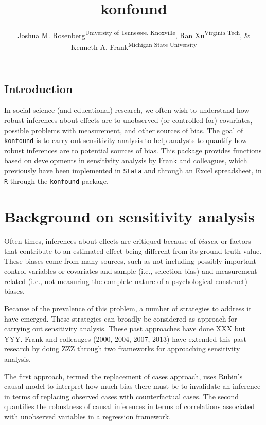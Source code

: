 \documentclass[man]{apa6}
\title{konfound}
\author{Joshua M. Rosenberg\textsuperscript{University of Tennessee, Knoxville},
Ran Xu\textsuperscript{Virginia Tech}, \& Kenneth A.
Frank\textsuperscript{Michigan State University}}
\date{}
\affiliation{
\vspace{0.5cm}
}
\theoremstyle{definition}
\theoremstyle{definition}
\theoremstyle{definition}
\theoremstyle{remark}
\begin{document}
\maketitle

\subsection{Introduction}\label{introduction}

In social science (and educational) research, we often wish to
understand how robust inferences about effects are to unobserved (or
controlled for) covariates, possible problems with measurement, and
other sources of bias. The goal of \texttt{konfound} is to carry out
sensitivity analysis to help analysts to quantify how robust inferences
are to potential sources of bias. This package provides functions based
on developments in sensitivity analysis by Frank and colleagues, which
previously have been implemented in \texttt{Stata} and through an Excel
spreadsheet, in \texttt{R} through the \texttt{konfound} package.

\section{Background on sensitivity
analysis}\label{background-on-sensitivity-analysis}

Often times, inferences about effects are critiqued because of
\emph{biases}, or factors that contribute to an estimated effect being
different from its ground truth value. These biases come from many
sources, such as not including possibly important control variables or
covariates and sample (i.e., selection bias) and measurement-related
(i.e., not measuring the complete nature of a psychological construct)
biases.

Because of the prevalence of this problem, a number of strategies to
address it have emerged. These strategies can broadly be considered as
approach for carrying out sensitivity analysis. These past approaches
have done XXX but YYY. Frank and colleauges (2000, 2004, 2007, 2013)
have extended this past research by doing ZZZ through two frameworks for
approaching sensitivity analysis.

The first approach, termed the replacement of cases approach, uses
Rubin's causal model to interpret how much bias there must be to
invalidate an inference in terms of replacing observed cases with
counterfactual cases. The second quantifies the robustness of causal
inferences in terms of correlations associated with unobserved variables
in a regression framework.
\end{document}
